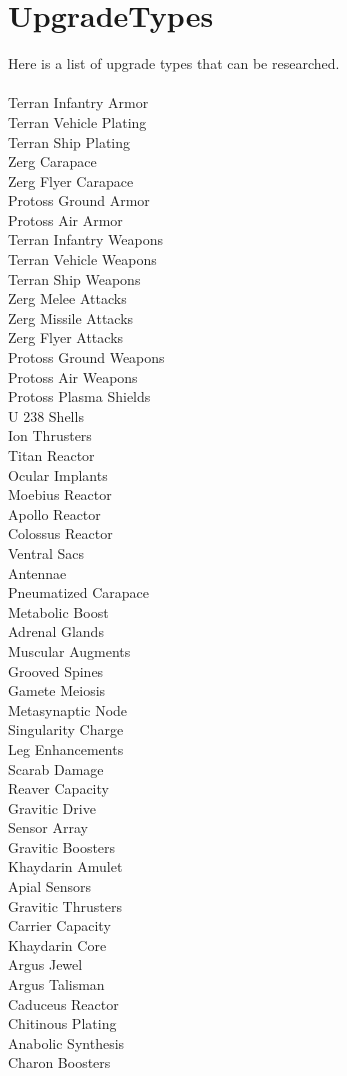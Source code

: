 \documentclass[english,11pt]{report}
\begin{document}
\chapter{UpgradeTypes}
Here is a list of upgrade types that can be researched.\\
\\
Terran Infantry Armor\\
Terran Vehicle Plating\\
Terran Ship Plating\\
Zerg Carapace\\
Zerg Flyer Carapace\\
Protoss Ground Armor\\
Protoss Air Armor\\
Terran Infantry Weapons\\
Terran Vehicle Weapons\\
Terran Ship Weapons\\
Zerg Melee Attacks\\
Zerg Missile Attacks\\
Zerg Flyer Attacks\\
Protoss Ground Weapons\\
Protoss Air Weapons\\
Protoss Plasma Shields\\
U 238 Shells\\
Ion Thrusters\\
Titan Reactor\\
Ocular Implants\\
Moebius Reactor\\
Apollo Reactor\\
Colossus Reactor\\
Ventral Sacs\\
Antennae\\
Pneumatized Carapace\\
Metabolic Boost\\
Adrenal Glands\\
Muscular Augments\\
Grooved Spines\\
Gamete Meiosis\\
Metasynaptic Node\\
Singularity Charge\\
Leg Enhancements \\
Scarab Damage\\
Reaver Capacity\\
Gravitic Drive\\
Sensor Array\\
Gravitic Boosters\\
Khaydarin Amulet\\
Apial Sensors\\
Gravitic Thrusters \\
Carrier Capacity\\
Khaydarin Core\\
Argus Jewel\\
Argus Talisman\\
Caduceus Reactor\\
Chitinous Plating\\
Anabolic Synthesis\\
Charon Boosters
\end{document}
